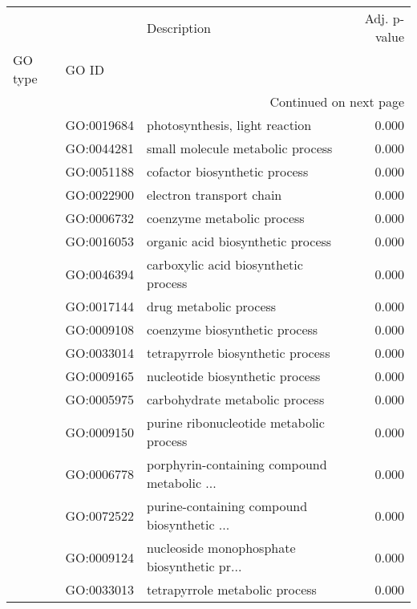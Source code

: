 \begin{longtable}{lllr}
\toprule
   &            &                                  Description &  Adj. p-value \\
GO type & GO ID &                                              &               \\
\midrule
\endhead
\midrule
\multicolumn{4}{r}{{Continued on next page}} \\
\midrule
\endfoot

\bottomrule
\endlastfoot
\multirow{119}{*}{BP} & GO:0019684 &               photosynthesis, light reaction &         0.000 \\
   & GO:0044281 &             small molecule metabolic process &         0.000 \\
   & GO:0051188 &                cofactor biosynthetic process &         0.000 \\
   & GO:0022900 &                     electron transport chain &         0.000 \\
   & GO:0006732 &                   coenzyme metabolic process &         0.000 \\
   & GO:0016053 &            organic acid biosynthetic process &         0.000 \\
   & GO:0046394 &         carboxylic acid biosynthetic process &         0.000 \\
   & GO:0017144 &                       drug metabolic process &         0.000 \\
   & GO:0009108 &                coenzyme biosynthetic process &         0.000 \\
   & GO:0033014 &            tetrapyrrole biosynthetic process &         0.000 \\
   & GO:0009165 &              nucleotide biosynthetic process &         0.000 \\
   & GO:0005975 &               carbohydrate metabolic process &         0.000 \\
   & GO:0009150 &      purine ribonucleotide metabolic process &         0.000 \\
   & GO:0006778 &  porphyrin-containing compound metabolic ... &         0.000 \\
   & GO:0072522 &  purine-containing compound biosynthetic ... &         0.000 \\
   & GO:0009124 &  nucleoside monophosphate biosynthetic pr... &         0.000 \\
   & GO:0033013 &               tetrapyrrole metabolic process &         0.000 \\

\end{longtable}
